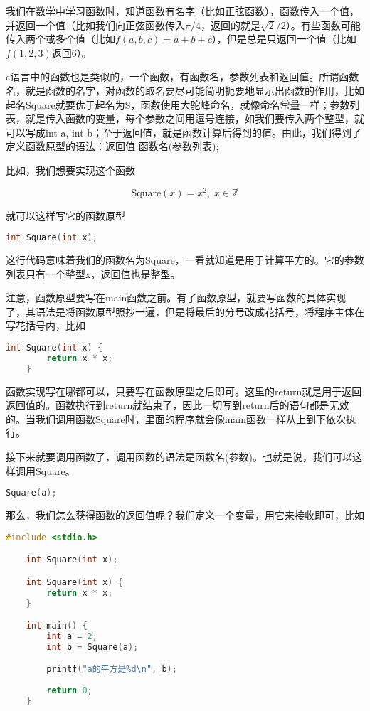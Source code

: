 我们在数学中学习函数时，知道函数有名字（比如正弦函数），函数传入一个值，并返回一个值（比如我们向正弦函数传入$\pi/4$，返回的就是$\sqrt{2}/2$）。有些函数可能传入两个或多个值（比如$f(a, b, c) = a + b + c$），但是总是只返回一个值（比如$f(1, 2, 3)$返回6）。

c语言中的函数也是类似的，一个函数，有函数名，参数列表和返回值。所谓函数名，就是函数的名字，对函数的取名要尽可能简明扼要地显示出函数的作用，比如起名Square就要优于起名为S，函数使用大驼峰命名，就像命名常量一样；参数列表，就是传入函数的变量，每个参数之间用逗号连接，如我们要传入两个整型，就可以写成int a, int b；至于返回值，就是函数计算后得到的值。由此，我们得到了定义函数原型的语法：返回值 函数名(参数列表);

比如，我们想要实现这个函数

\[ \text{Square}(x) = x^2, \; x \in \mathbb{Z} \]

就可以这样写它的函数原型

\begin{lstlisting}[language=C]
    int Square(int x);
\end{lstlisting}

这行代码意味着我们的函数名为Square，一看就知道是用于计算平方的。它的参数列表只有一个整型x，返回值也是整型。

注意，函数原型要写在main函数之前。有了函数原型，就要写函数的具体实现了，其语法是将函数原型照抄一遍，但是将最后的分号改成花括号，将程序主体在写花括号内，比如

\begin{lstlisting}[language=C]
    int Square(int x) {
        return x * x;
    }
\end{lstlisting}

函数实现写在哪都可以，只要写在函数原型之后即可。这里的return就是用于返回返回值的。函数执行到return就结束了，因此一切写到return后的语句都是无效的。当我们调用函数Square时，里面的程序就会像main函数一样从上到下依次执行。

接下来就要调用函数了，调用函数的语法是函数名(参数)。也就是说，我们可以这样调用Square。

\begin{lstlisting}[language=C]
    Square(a);
\end{lstlisting}

那么，我们怎么获得函数的返回值呢？我们定义一个变量，用它来接收即可，比如

\begin{lstlisting}[language=C]
    #include <stdio.h>

    int Square(int x);

    int Square(int x) {
        return x * x;
    }

    int main() {
        int a = 2;
        int b = Square(a);

        printf("a的平方是%d\n", b);
        
        return 0;
    }
\end{lstlisting}

